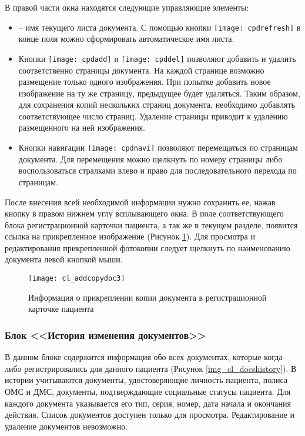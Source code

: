 {В правой части окна находятся следующие управляющие элементы:
\begin{itemize}
 \item {} -- имя текущего листа документа. С помощью кнопки \texttt{[image: cpdrefresh]} в конце поля можно сформировать автоматическое имя листа.
 \item Кнопки \texttt{[image: cpdadd]} и \texttt{[image: cpddel]} позволяют добавить и удалить соответственно страницы документа. На каждой странице возможно размещение только одного изображения. При попытке добавить новое изображение на ту же страницу, предыдущее будет удаляться. Таким образом, для сохранения копий нескольких страниц документа, необходимо добавлять соответствующее число страниц. Удаление страницы приводит к удалению размещенного на ней изображения.
 \item Кнопки навигации  \texttt{[image: cpdnavi]} позволяют перемещаться по страницам документа. Для перемещения можно щелкнуть по номеру страницы либо воспользоваться стралками влево и право для последовательного перехода по страницам. 
\end{itemize}

После внесения всей необходимой информации нужно сохранить ее, нажав кнопку  в правом нижнем углу всплывающего окна. В поле  соответствующего блока регистрационной карточки пациента, а так же в текущем разделе, появится ссылка на прикрепленное изображение (Рисунок \ref{img_cl_addcopydoc3}). Для просмотра и редактирования прикрепленной фотокопии следует щелкнуть по наименованию документа левой кнопкой мыши. 

\begin{figure}[ht]\centering
 \texttt{[image: cl\_addcopydoc3]}
 \caption{Информация о прикреплении копии документа в регистрационной карточке пациента}
 \label{img_cl_addcopydoc3}
\end{figure} 
  

\subsubsection{Блок <<История изменения документов>>} \label{cl_docshistory}

В данном блоке содержится информация обо всех документах, которые когда-либо регистрировались для данного пациента (Рисунок \ref{img_cl_docshistory}). В истории учитываются документы, удостоверяющие личность пациента, полиса ОМС и ДМС, документы, подтверждающие социальные статусы пациента. Для каждого документа указывается его тип, серия, номер, дата начала и окончания действия. Список документов доступен только для просмотра. Редактирование и удаление документов невозможно. 

}
